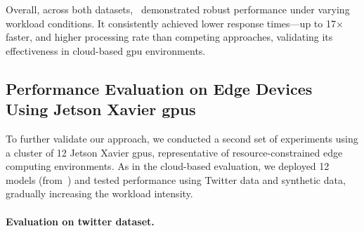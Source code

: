 Overall, across both datasets,~\roomie{} demonstrated robust performance under varying workload conditions. It consistently achieved lower response times—up to 17× faster, and higher processing rate than competing approaches, validating its effectiveness in cloud-based \acrshort{gpu} environments.



\subsection{Performance Evaluation on Edge Devices Using Jetson Xavier \acrshort{gpu}s}

To further validate our approach, we conducted a second set of experiments using a cluster of 12 Jetson Xavier \acrshort{gpu}s, representative of resource-constrained edge computing environments. As in the cloud-based evaluation, we deployed 12 models (from~) and tested performance using Twitter data and synthetic data, gradually increasing the workload intensity.

\paragraph{Evaluation on twitter dataset.}

